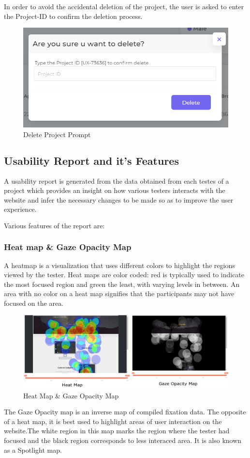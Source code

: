 \documentclass[hidelinks,12pt,a4paper,final]{extreport}
\begin{document}
In order to avoid the accidental deletion of the project, the user is asked to enter the Project-ID to confirm the deletion process.
\begin{figure}[H]
    \centering
    \includegraphics[scale=.8]{delete-project.png}
    \caption{Delete Project Prompt}
\end{figure}

\newpage
\subsection{Usability Report and it's Features}
A usability report is generated from the data obtained from each testes of a project which provides an insight on how various testers interacts with the website and infer the necessary changes to be made so as to improve the user experience.

Various features of the report are:
\subsubsection{Heat map \& Gaze Opacity Map}
A heatmap is a visualization that uses different colors to highlight the regions viewed by the tester. Heat maps are color coded: red is typically used to indicate the most focused region and
green the least, with varying levels in between. An area with no color on a heat map signifies that the participants may not have focused on the area.
\begin{figure}[H]
    \centering
    \includegraphics[width=\linewidth]{heat_gaze_map.png}
    \caption{Heat Map \& Gaze Opacity Map}
\end{figure}
The Gaze Opacity map is an inverse map of compiled fixation data. The opposite of a heat map, it is best used to highlight
areas of user interaction on the website.The white region in this map marks the region where the tester had focused and the black region corresponds to less interaced area.
It is also known as a Spotlight map.
\end{document}
